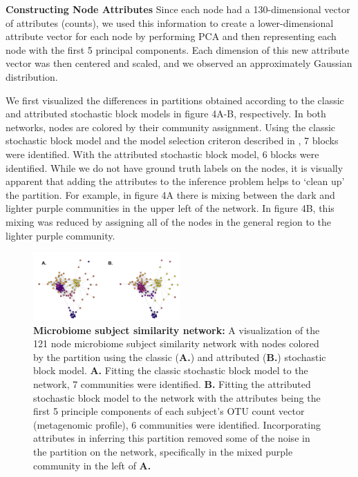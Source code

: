 \documentclass[journal]{IEEEtran}
\begin{document}
{\bf Constructing Node Attributes}
Since each node had a 130-dimensional vector of attributes (counts), we used this information to create a lower-dimensional attribute vector for each node by performing PCA and then representing each node with the first 5 principal components. Each dimension of this new attribute vector was then centered and scaled, and we observed an approximately Gaussian distribution. 

We first visualized the differences in partitions obtained according to the classic and attributed stochastic block models in figure 4A-B, respectively. In both networks, nodes are colored by their community assignment. Using the classic stochastic block model and the model selection criteron described in \cite{dudin}, 7 blocks were identified. With the attributed stochastic block model, 6 blocks were identified. While we do not have ground truth labels on the nodes, it is visually apparent that adding the attributes to the inference problem helps to `clean up' the partition. For example, in figure 4A there is mixing between the dark and lighter purple communities in the upper left of the network. In figure 4B, this mixing was reduced by assigning all of the nodes in the general region to the lighter purple community. 

\begin{figure}[h!]
\begin{center}
\includegraphics[width=0.5\textwidth]{MicrobiomeNets_Dec12.pdf}
\caption{{\bf Microbiome subject similarity network:} A visualization of the 121 node microbiome subject similarity network with nodes colored by the partition using the classic ({\bf A.}) and attributed ({\bf B.}) stochastic block model. {\bf A.} Fitting the classic stochastic block model to the network, 7 communities were identified. {\bf B.} Fitting the attributed stochastic block model to the network with the attributes being the first 5 principle components of each subject's OTU count vector (metagenomic profile), 6 communities were identified. Incorporating attributes in inferring this partition removed some of the noise in the partition on the network, specifically in the mixed purple community in the left of {\bf A.}}
\end{center}
\end{figure}
\end{document}
